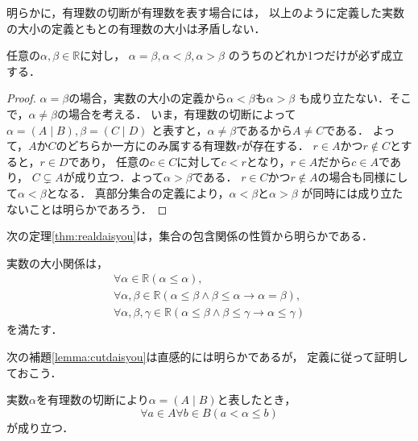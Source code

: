     明らかに，有理数の切断が有理数を表す場合には，
    以上のように定義した実数の大小の定義ともとの有理数の大小は矛盾しない．

    \begin{lemma} \label{lemma:daisyouwelldefined}
      任意の$\alpha ,  \beta \in \mathbb{R}$に対し，
      $\alpha=\beta,  \alpha<\beta,  \alpha>\beta$
      のうちのどれか1つだけが必ず成立する．
    \end{lemma}

    \begin{proof}
      $\alpha = \beta$の場合，実数の大小の定義から$\alpha < \beta$も$\alpha > \beta$
      も成り立たない．そこで，$\alpha \neq \beta$の場合を考える．
      いま，有理数の切断によって$\alpha = (A \mid B) ,  \beta = (C \mid D)$
      と表すと，$\alpha \neq \beta$であるから$A \neq C$である．
      よって，$A$か$C$のどちらか一方にのみ属する有理数$r$が存在する．
      $r \in A$かつ$r \notin C$とすると，$r \in D$であり，
      任意の$c \in C$に対して$c < r$となり，$r \in A$だから$c \in A$であり，
      $C \subsetneq A$が成り立つ．よって$\alpha > \beta$である．
      $r \in C$かつ$r \notin A$の場合も同様にして$\alpha < \beta$となる．
      真部分集合の定義により，$\alpha < \beta$と$\alpha > \beta$
      が同時には成り立たないことは明らかであろう．
    \end{proof}


    次の定理\ref{thm:realdaisyou}は，集合の包含関係の性質から明らかである．
    \begin{thm} \label{thm:realdaisyou}
      実数の大小関係は，
      \begin{align}
        \forall \alpha \in \mathbb{R} (\alpha \leq \alpha) ,
        \label{eq:realreflexive} \\
        \forall \alpha , \beta \in \mathbb{R} 
        ( \alpha \leq \beta \land \beta \leq \alpha \to \alpha = \beta) ,
        \label{eq:realsymmetry} \\
        \forall \alpha , \beta ,\gamma \in \mathbb{R} 
        ( \alpha \leq \beta \land \beta \leq \gamma \to \alpha \leq \gamma)
        \label{eq:realsuiiritu}
      \end{align}
      を満たす．
    \end{thm}

    次の補題\ref{lemma:cutdaisyou}は直感的には明らかであるが，
    定義に従って証明しておこう．
    \begin{lemma} \label{lemma:cutdaisyou}
      実数$\alpha$を有理数の切断により$\alpha = (A \mid B)$と表したとき，
      \[
        \forall a \in A \forall b \in B( a < \alpha \leq b)
      \]
      が成り立つ．
    \end{lemma}

